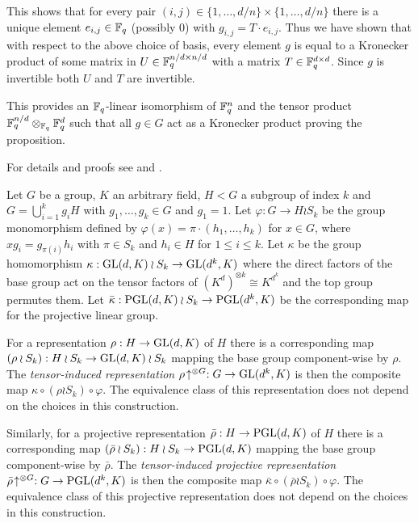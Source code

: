 This shows that for every pair $(i,j) \in \{ 1, \ldots, d/n \} \times 
\{ 1, \ldots, d/n \}$ there
is a unique element $e_{i,j} \in \mathbb{F}_q$ (possibly $0$) with 
$g_{i,j} = T \cdot e_{i,j}$. Thus we have shown that with respect to
the above choice of basis, every element $g$ is equal to a Kronecker 
product of some matrix in $U \in \mathbb{F}_q^{n/d \times n/d}$ with a matrix
$T \in \mathbb{F}_q^{d \times d}$. Since $g$ is invertible both 
$U$ and $T$ are invertible. 

This provides an $\mathbb{F}_q$-linear isomorphism of 
$\mathbb{F}_q^n$ and the tensor product $\mathbb{F}_q^{n/d} \otimes_{\mathbb{F}_q} \mathbb{F}_q^d$
such that all $g \in G$ act as a Kronecker product proving the
proposition.
\proofend

\begin{DefProp}
    For details and proofs see \cite[13A]{CRI} and \cite[Section~2]{kovacs}.

    Let $G$ be a group, $K$ an arbitrary field, $H<G$ a subgroup of
    index $k$ and $G=\bigcup_{i=1}^k g_i H$ with $g_1,\ldots,g_k \in
    G$ and $g_1=1$. Let $\varphi : G \to H \wr S_k$ be the group
    monomorphism defined by $\varphi(x) = \pi \cdot (h_1,\ldots,h_k)$
    for $x \in G$, where $xg_i = g_{\pi(i)}h_i$ with $\pi \in S_k$
    and $h_i \in H$ for $1 \le i \le k$.
    Let $\kappa$ be the group homomorphism $\kappa: \GL(d,K)
    \wr S_k \to \GL(d^k,K)$ where the direct factors of the base group
    act on the tensor factors of $(K^d)^{\otimes k} \cong K^{d^k}$ and
    the top group permutes them. Let $\bar\kappa : \PGL(d,K) \wr S_k
    \to \PGL(d^k,K)$ be the corresponding map for the projective linear
    group.

    For a representation $\rho: H \to \GL(d,K)$ of $H$
    there is a corresponding map $(\rho \wr S_k) : H \wr S_k \to
    \GL(d,K) \wr S_k$ mapping the base group component-wise by $\rho$. 
    The \emph{tensor-induced representation}
    $\rho\!\uparrow^{\otimes G} : G \to \GL(d^k,K)$ is then the
    composite map $\kappa \circ (\rho \wr S_k) \circ \varphi$. The
    equivalence class of this representation does not depend on the
    choices in this construction.

    Similarly,
    for a projective representation $\bar\rho : H \to \PGL(d,K)$ of
    $H$ there is a corresponding map $(\bar\rho \wr
    S_k) : H \wr S_k \to \PGL(d,K)$ mapping the base group
    component-wise by $\bar\rho$.
    The \emph{tensor-induced projective representation}
    $\bar\rho\!\uparrow^{\otimes G} : G \to \PGL(d^k,K)$ is then the
    composite map $\bar\kappa \circ (\bar\rho \wr S_k) \circ \varphi$.
    The equivalence class of this projective representation does not
    depend on the choices in this construction.
\end{DefProp}

